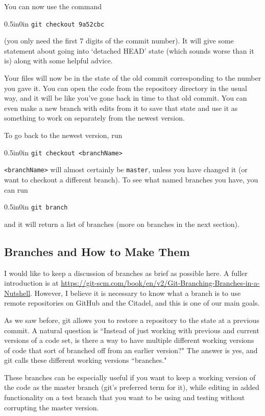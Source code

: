 \documentclass[11pt]{article}
\newcommand{\code}[1]{\begin{adjustwidth}{0.5in}{0in}
    \texttt{#1}
    \end{adjustwidth}}
\begin{document}
You can now use the command

\code{git checkout 9a52cbc}

(you only need the first 7 digits of the commit number).  It will give some statement about going into `detached HEAD' state (which sounds worse than it is) along with some helpful advice.

Your files will now be in the state of the old commit corresponding to the number you gave it.  You can open the code from the repository directory in the usual way, and it will be like you've gone back in time to that old commit.  You can even make a new branch with edits from it to save that state and use it as something to work on separately from the newest version.

To go back to the newest version, run

\code{git checkout <branchName>}

\texttt{<branchName>} will almost certainly be \texttt{master}, unless you have changed it (or want to checkout a different branch).  To see what named branches you have, you can run 

\code{git branch}

and it will return a list of branches (more on branches in the next section).
 
\subsection{Branches and How to Make Them}
\label{sec:Branches}

I would like to keep a discussion of branches as brief as possible here.  A fuller introduction is at \url{https://git-scm.com/book/en/v2/Git-Branching-Branches-in-a-Nutshell}.  However, I believe it is necessary to know what a branch is to use remote repositories on GitHub and the Citadel, and this is one of our main goals.

As we saw before, git allows you to restore a repository to the state at a previous commit.  A natural question is ``Instead of just working with previous and current versions of a code set, is there a way to have multiple different working versions of code that sort of branched off from an earlier version?"  The answer is yes, and git calls these different working versions ``branches."

These branches can be especially useful if you want to keep a working version of the code as the master branch (git's preferred term for it), while editing in added functionality on a test branch that you want to be using and testing without corrupting the master version.
\end{document}
